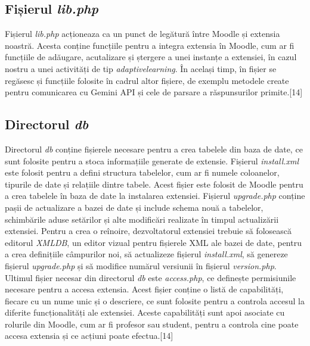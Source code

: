 \subsection{Fișierul \textit{lib.php}}
Fișierul \textit{lib.php} acționeaza ca un punct de legătură între Moodle și extensia noastră. Acesta conține funcțiile pentru a integra extensia în Moodle, cum ar fi funcțiile de adăugare, 
acutalizare și ștergere a unei instanțe a extensiei, în cazul nostru a unei activități de tip \textit{adaptivelearning}. În același timp, în fișier se regăsesc și funcțiile folosite 
în cadrul altor fișiere, de exemplu metodele create pentru comunicarea cu Gemini API și cele de parsare a răspunsurilor primite.[14]

\subsection{Directorul \textit{db}}
Directorul \textit{db} conține fișierele necesare pentru a crea tabelele din baza de date, ce sunt folosite pentru a stoca informațiile generate de extensie. Fișierul \textit{install.xml}
este folosit pentru a defini structura tabelelor, cum ar fi numele coloanelor, tipurile de date și relațiile dintre tabele. Acest fișier este folosit de Moodle pentru a crea tabelele
în baza de date la instalarea extensiei. Fișierul \textit{upgrade.php} conține pașii de actualizare a bazei de date și include schema nouă a tabelelor, schimbările aduse setărilor și 
alte modificări realizate în timpul actualizării extensiei. Pentru a crea o reînoire, dezvoltatorul extensiei trebuie să folosească editorul \textit{XMLDB}, un editor vizual pentru
fișierele XML ale bazei de date, pentru a crea definițiile câmpurilor noi, să actualizeze fișierul \textit{install.xml}, să genereze fișierul \textit{upgrade.php} și să modifice numărul 
versiunii în fișierul \textit{version.php}. Ultimul fișier necesar din directorul \textit{db} este \textit{access.php}, ce definește permisiunile necesare pentru a accesa extensia. 
Acest fișier conține o listă de capabilități, fiecare cu un nume unic și o descriere, ce sunt folosite pentru a controla accesul la diferite funcționalități ale extensiei. Aceste capabilități
sunt apoi asociate cu rolurile din Moodle, cum ar fi profesor sau student, pentru a controla cine poate accesa extensia și ce acțiuni poate efectua.[14]

